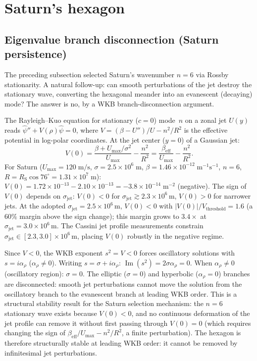 \section{Saturn's hexagon}
\label{sec:saturn}

\subsection{Eigenvalue branch disconnection (Saturn persistence)}

The preceding subsection selected Saturn's wavenumber $n = 6$ via
Rossby stationarity.  A natural follow-up: can smooth perturbations
of the jet destroy the stationary wave, converting the hexagonal
meander into an evanescent (decaying) mode?  The answer is no, by
a WKB branch-disconnection argument.

The Rayleigh--Kuo equation for stationary ($c = 0$) mode~$n$ on a
zonal jet $U(y)$ reads $\hat\psi'' + V(\rho)\hat\psi = 0$, where
$V = (\beta - U'')/U - n^2/R^2$ is the effective potential in
log-polar coordinates.  At the jet center ($y = 0$) of a Gaussian jet:
\[
  V(0) = \frac{\beta + U_{\max}/\sigma^2}{U_{\max}} - \frac{n^2}{R^2}
  = \frac{\beta_{\mathrm{eff}}}{U_{\max}} - \frac{n^2}{R^2}.
\]
For Saturn ($U_{\max} = 120\;\mathrm{m/s}$, $\sigma = 2.5\times
10^6\;\mathrm{m}$, $\beta = 1.46\times 10^{-12}\;\mathrm{m^{-1}
s^{-1}}$, $n = 6$, $R = R_{\mathrm{S}}\cos 76^\circ = 1.31\times
10^7\;\mathrm{m}$):
$V(0) = 1.72\times 10^{-13} - 2.10\times 10^{-13} =
-3.8\times 10^{-14}\;\mathrm{m}^{-2}$ (negative).
The sign of $V(0)$ depends on $\sigma_{\mathrm{jet}}$:
$V(0) < 0$ for $\sigma_{\mathrm{jet}} \gtrsim 2.3 \times 10^6$\,m,
$V(0) > 0$ for narrower jets.  At the adopted
$\sigma_{\mathrm{jet}} = 2.5 \times 10^6$\,m, $V(0) < 0$ with
$|V(0)|/V_{\mathrm{threshold}} = 1.6$ (a $60\%$ margin above the
sign change); this margin grows to $3.4\times$ at
$\sigma_{\mathrm{jet}} = 3.0 \times 10^6$\,m.  The Cassini
jet profile measurements constrain
$\sigma_{\mathrm{jet}} \in [2.3, 3.0] \times 10^6$\,m, placing
$V(0)$ robustly in the negative regime.

Since $V < 0$, the WKB exponent $s^2 = V < 0$ forces oscillatory
solutions with $s = i\alpha_\rho$ ($\alpha_\rho \ne 0$).  Writing
$s = \sigma + i\alpha_\rho$:
$\operatorname{Im}(s^2) = 2\sigma\alpha_\rho = 0$.
When $\alpha_\rho \ne 0$ (oscillatory region): $\sigma = 0$.
The elliptic ($\sigma = 0$) and hyperbolic ($\alpha_\rho = 0$)
branches are disconnected: smooth jet perturbations cannot move the
solution from the oscillatory branch to the evanescent branch at
leading WKB order.  This is a structural stability result for the
Saturn selection mechanism: the $n = 6$ stationary wave exists
because $V(0) < 0$, and no continuous deformation of the jet profile
can remove it without first passing through $V(0) = 0$ (which
requires changing the sign of $\beta_{\mathrm{eff}}/U_{\max} -
n^2/R^2$, a finite perturbation).  The hexagon is therefore
structurally stable at leading WKB order: it cannot be removed by
infinitesimal jet perturbations.

